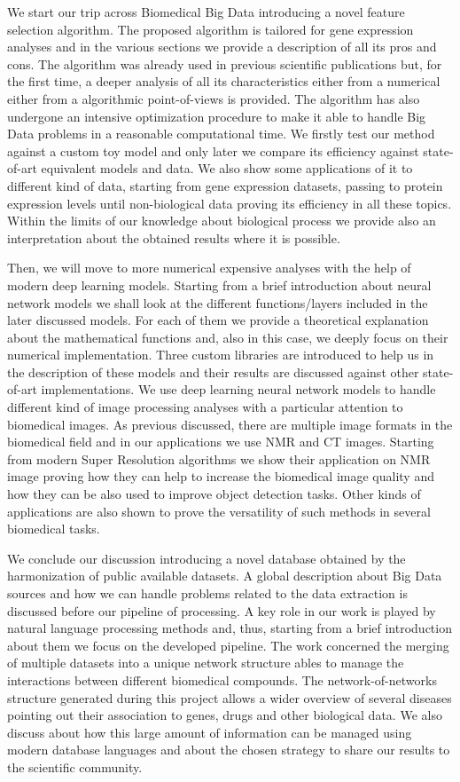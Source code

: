 \documentclass{standalone}
\begin{document}
We start our trip across Biomedical Big Data introducing a novel feature selection algorithm.
The proposed algorithm is tailored for gene expression analyses and in the various sections we provide a description of all its pros and cons.
The algorithm was already used in previous scientific publications but, for the first time, a deeper analysis of all its characteristics either from a numerical either from a algorithmic point-of-views is provided.
The algorithm has also undergone an intensive optimization procedure to make it able to handle Big Data problems in a reasonable computational time.
We firstly test our method against a custom toy model and only later we compare its efficiency against state-of-art equivalent models and data.
We also show some applications of it to different kind of data, starting from gene expression datasets, passing to protein expression levels until non-biological data proving its efficiency in all these topics.
Within the limits of our knowledge about biological process we provide also an interpretation about the obtained results where it is possible.

Then, we will move to more numerical expensive analyses with the help of modern deep learning models.
Starting from a brief introduction about neural network models we shall look at the different functions/layers included in the later discussed models.
For each of them we provide a theoretical explanation about the mathematical functions and, also in this case, we deeply focus on their numerical implementation.
Three custom libraries are introduced to help us in the description of these models and their results are discussed against other state-of-art implementations.
We use deep learning neural network models to handle different kind of image processing analyses with a particular attention to biomedical images.
As previous discussed, there are multiple image formats in the biomedical field and in our applications we use NMR and CT images.
Starting from modern Super Resolution algorithms we show their application on NMR image proving how they can help to increase the biomedical image quality and how they can be also used to improve object detection tasks.
Other kinds of applications are also shown to prove the versatility of such methods in several biomedical tasks.

We conclude our discussion introducing a novel database obtained by the harmonization of public available datasets.
A global description about Big Data sources and how we can handle problems related to the data extraction is discussed before our pipeline of processing.
A key role in our work is played by natural language processing methods and, thus, starting from a brief introduction about them we focus on the developed pipeline.
The work concerned the merging of multiple datasets into a unique network structure ables to manage the interactions between different biomedical compounds.
The network-of-networks structure generated during this project allows a wider overview of several diseases pointing out their association to genes, drugs and other biological data.
We also discuss about how this large amount of information can be managed using modern database languages and about the chosen strategy to share our results to the scientific community.
\end{document}
